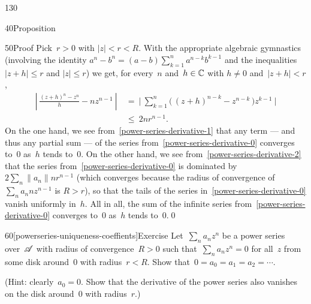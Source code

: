 \begin{parsec}{130}
\begin{point}{40}{Proposition}
\begin{point}{50}{Proof}
Pick~$r>0$ with $\left|z\right| < r < R$.
With the appropriate algebraic gymnastics
(involving the identity
$a^n-b^n=(a-b)\sum_{k=1}^n a^{n-k}b^{k-1}$
and the inequalities $\left|z+h\right| \leq r$
and $\left|z\right|\leq r$)
we get, for every~$n$
and~$h\in \mathbb{C}$ with
$h\neq 0$ and~$\left|z+h\right|<r$,
\begin{align}
\left|\  \frac{(z+h)^n-z^n}{h}-nz^{n-1}\ \right|
\ &= \ 
\biggl|\ \sum_{k=1}^n \bigl(\,(z+h)^{n-k}-z^{n-k}\,\bigr)z^{k-1} \ \biggr|
\label{power-series-derivative-1}
\\ 
\label{power-series-derivative-2}
\ &\leq\ 
2nr^{n-1}.
\end{align}
On the one hand,
we see from~\eqref{power-series-derivative-1}
that any term
--- and thus any partial sum ---
of the series from~\eqref{power-series-derivative-0}
converges to~$0$ as~$h$ tends to~$0$.
On the other hand,
we see from~\eqref{power-series-derivative-2}
that the series 
from~\eqref{power-series-derivative-0}
is dominated by~$2\sum_n \|a_n\|nr^{n-1}$
(which converges
because the radius of convergence of $\sum_n a_n nz^{n-1}$
is $R>r$),
so that the tails of the series in~\eqref{power-series-derivative-0}
vanish uniformly in~$h$.
All in all, the sum of the infinite series
from~\eqref{power-series-derivative-0}
converges to~$0$ as~$h$ tends to~$0$.\qed
\end{point}
\end{point}
\begin{point}{60}[powerseries-uniqueness-coeffients]{Exercise}%
Let~$\sum_n a_n z^n$
be a power series over~$\mathscr{A}$
with radius of convergence~$R>0$
such that~$\sum_n a_n z^n=0$
for all~$z$ from
some disk around~$0$ with radius~$r<R$.
Show that~$0=a_0=a_1=a_2=\dotsb$.

(Hint: clearly~$a_0=0$.  Show that the derivative
of the power series also vanishes on the disk around~$0$
with radius~$r$.)
\end{point}
\end{parsec}%
